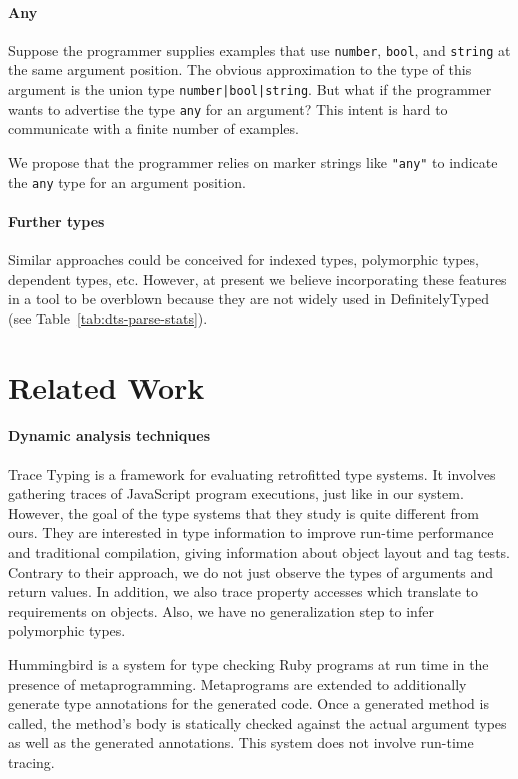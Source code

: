 \documentclass[sigconf]{acmart}
\begin{document}
\paragraph*{Any}
Suppose the programmer supplies examples that use \lstinline/number/, \lstinline/bool/, and
\lstinline/string/ at the same argument position. The obvious approximation to the type of
this argument is the union type \lstinline/number|bool|string/. But what if the programmer
wants to advertise the type \lstinline/any/ for an argument? This intent is hard to
communicate with a finite number of examples.

We propose that the programmer relies on marker strings like \lstinline/"any"/ to indicate
the \lstinline/any/ type for an argument position.

\paragraph*{Further types}
Similar approaches could be conceived for indexed types, polymorphic types, dependent
types, etc. However, at present we believe incorporating these features in a tool to be
overblown because they are not widely used in DefinitelyTyped (see
Table~\ref{tab:dts-parse-stats}). 

\section{Related Work}
\label{sec:related-work}
\paragraph*{Dynamic analysis techniques} Trace Typing
\cite{DBLP:conf/ecoop/AndreasenGCSTS16} is a framework for evaluating
retrofitted type systems. It involves gathering traces of JavaScript program
executions, just like in our system. However, the goal of the type
systems that they study is quite different from ours. They are
interested in type information to improve run-time performance and
traditional compilation, giving information about object layout and
tag tests. Contrary to their approach, we do not just observe the
types of arguments and return values. In addition, we also trace
property accesses which translate to requirements on objects. Also, we
have no generalization step to infer polymorphic types.

Hummingbird \cite{DBLP:conf/pldi/RenF16} is a system for type checking
Ruby programs at run time in the presence of
metaprogramming. Metaprograms are extended to additionally generate
type annotations for the generated code. Once a generated method is
called, the method's body is statically checked against the actual
argument types as well as the generated annotations. This system does
not involve run-time tracing.
\end{document}

